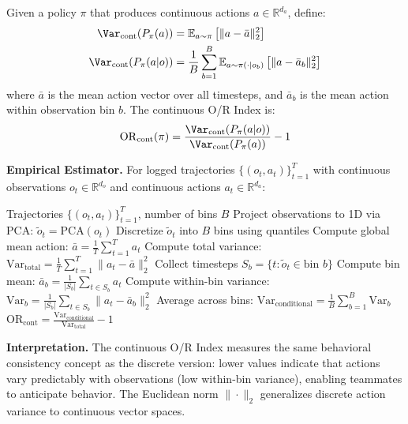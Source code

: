 \begin{definition}
Given a policy $\pi$ that produces continuous actions $a \in \mathbb{R}^{d_a}$, define:
\begin{align}
\Var_{\mathrm{cont}}(P_\pi(a)) &= \mathbb{E}_{a \sim \pi}\left[\|a - \bar{a}\|_2^2\right] \label{eq:cont_var_marginal} \\
\Var_{\mathrm{cont}}(P_\pi(a|o)) &= \frac{1}{B} \sum_{b=1}^{B} \mathbb{E}_{a \sim \pi(\cdot|o_b)}\left[\|a - \bar{a}_b\|_2^2\right] \label{eq:cont_var_conditional}
\end{align}
where $\bar{a}$ is the mean action vector over all timesteps, and $\bar{a}_b$ is the mean action within observation bin $b$. The continuous O/R Index is:
\begin{equation}
\mathrm{OR}_{\mathrm{cont}}(\pi) = \frac{\Var_{\mathrm{cont}}(P_\pi(a|o))}{\Var_{\mathrm{cont}}(P_\pi(a))} - 1
\end{equation}
\end{definition}

\textbf{Empirical Estimator.} For logged trajectories $\{(o_t, a_t)\}_{t=1}^{T}$ with continuous observations $o_t \in \mathbb{R}^{d_o}$ and continuous actions $a_t \in \mathbb{R}^{d_a}$:

\begin{algorithm}[H]
\caption{Empirical Continuous-Action O/R Estimator}
\label{alg:cont_or}
\begin{algorithmic}[1]
\Require Trajectories $\{(o_t, a_t)\}_{t=1}^{T}$, number of bins $B$
\State Project observations to 1D via PCA: $\tilde{o}_t = \text{PCA}(o_t)$
\State Discretize $\tilde{o}_t$ into $B$ bins using quantiles
\State Compute global mean action: $\bar{a} = \frac{1}{T} \sum_{t=1}^{T} a_t$
\State Compute total variance: $\text{Var}_{\text{total}} = \frac{1}{T} \sum_{t=1}^{T} \|a_t - \bar{a}\|_2^2$
    \State Collect timesteps $S_b = \{t : \tilde{o}_t \in \text{bin } b\}$
    \State Compute bin mean: $\bar{a}_b = \frac{1}{|S_b|} \sum_{t \in S_b} a_t$
    \State Compute within-bin variance: $\text{Var}_b = \frac{1}{|S_b|} \sum_{t \in S_b} \|a_t - \bar{a}_b\|_2^2$
\EndFor
\State Average across bins: $\text{Var}_{\text{conditional}} = \frac{1}{B} \sum_{b=1}^{B} \text{Var}_b$
\State \Return $\text{OR}_{\text{cont}} = \frac{\text{Var}_{\text{conditional}}}{\text{Var}_{\text{total}}} - 1$
\end{algorithmic}
\end{algorithm}

\textbf{Interpretation.} The continuous O/R Index measures the same behavioral consistency concept as the discrete version: lower values indicate that actions vary predictably with observations (low within-bin variance), enabling teammates to anticipate behavior. The Euclidean norm $\|\cdot\|_2$ generalizes discrete action variance to continuous vector spaces.

